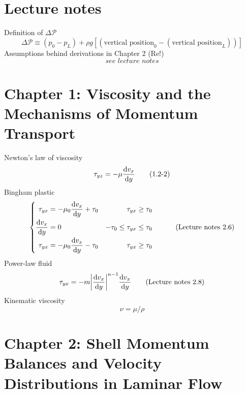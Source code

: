 \section{Lecture notes}
Definition of $\Delta\mathscr{P}$
\[
	\Delta\mathscr{P}\equiv(p_0-p_L)+\rho g[(\text{vertical position}_0-(\text{vertical position}_L))]\tag{Lecture notes 3.17}
\]
Assumptions behind derivations in Chapter 2 (Re!)
\[
	\textit{see lecture notes}\tag{Lecture notes 3.22}
\]
\section{Chapter 1: Viscosity and the Mechanisms of Momentum Transport}
Newton's law of viscosity
\[
	\tau_{yz}=-\mu\frac{\mathop{}\!\mathrm{d} v_x}{\mathop{}\!\mathrm{d} y}\tag{1.2-2}
\]
Bingham plastic
\[
	\begin{cases}
		\begin{aligned}
			\tau_{yx}           & =-\mu_0\frac{\mathop{}\!\mathrm{d} v_x}{\mathop{}\!\mathrm{d} y}+\tau_0 & \tau_{yx}\geq\tau_0            \\
			\frac{\mathop{}\!\mathrm{d} v_x}{\mathop{}\!\mathrm{d} y} & =0                                & -\tau_0\leq\tau_{yx}\leq\tau_0 \\
			\tau_{yx}           & =-\mu_0\frac{\mathop{}\!\mathrm{d} v_x}{\mathop{}\!\mathrm{d} y}-\tau_0 & \tau_{yx}\geq\-\tau_0
		\end{aligned}
	\end{cases}\tag{Lecture notes 2.6}
\]
Power-law fluid
\begin{align*}
	\tau_{yx}=-m\abs{\frac{\mathop{}\!\mathrm{d} v_x}{\mathop{}\!\mathrm{d} y}}^{n-1}\frac{\mathop{}\!\mathrm{d} v_x}{\mathop{}\!\mathrm{d} y}\tag{Lecture notes 2.8}
\end{align*}
Kinematic viscosity
\[
	\nu = \mu/\rho\tag{1.2-3}
\]
\section{Chapter 2: Shell Momentum Balances and Velocity Distributions in Laminar Flow}
